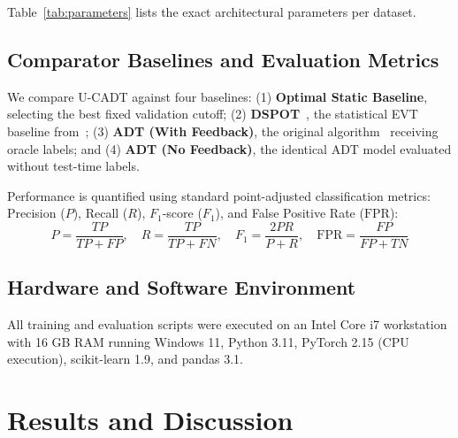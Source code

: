 \documentclass[conference]{IEEEtran}
\begin{document}
Table~\ref{tab:parameters} lists the exact architectural parameters per dataset.

\begin{table}[t]
\centering
\caption{ADT and U-CADT Parameter Configurations}
\label{tab:parameters}
\end{table}

\subsection{Comparator Baselines and Evaluation Metrics}
We compare U-CADT against four baselines: (1) \textbf{Optimal Static Baseline}, selecting the best fixed validation cutoff; (2) \textbf{DSPOT}~\cite{siffer2017anomaly}, the statistical EVT baseline from~\cite{yang2023adt}; (3) \textbf{ADT (With Feedback)}, the original algorithm~\cite{yang2023adt} receiving oracle labels; and (4) \textbf{ADT (No Feedback)}, the identical ADT model evaluated without test-time labels.

Performance is quantified using standard point-adjusted classification metrics: Precision ($P$), Recall ($R$), $F_1$-score ($F_1$), and False Positive Rate ($\text{FPR}$):
\begin{equation}
P = \frac{TP}{TP + FP}, \quad R = \frac{TP}{TP + FN}, \quad F_1 = \frac{2PR}{P + R}, \quad \text{FPR} = \frac{FP}{FP + TN}
\end{equation}

\subsection{Hardware and Software Environment}
All training and evaluation scripts were executed on an Intel Core i7 workstation with 16 GB RAM running Windows 11, Python 3.11, PyTorch 2.15 (CPU execution), scikit-learn 1.9, and pandas 3.1.

\section{Results and Discussion}
\end{document}
